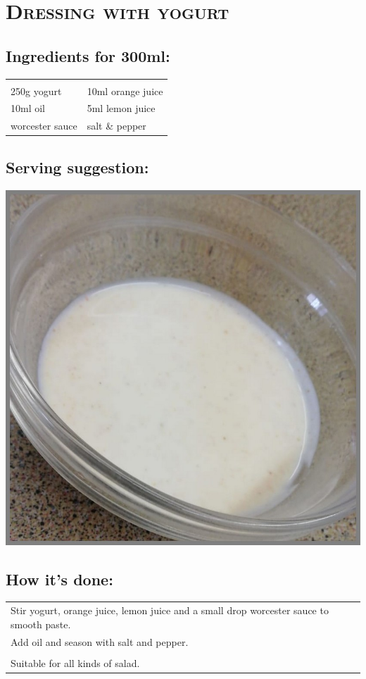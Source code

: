 \section{\textsc{Dressing with yogurt}}

\subsection*{Ingredients for 300ml:}

\begin{tabular}{p{7.5cm} p{7.5cm}}
	& \\
	250g yogurt & 10ml orange juice \\
	10ml oil & 5ml lemon juice \\
	worcester sauce & salt \& pepper
\end{tabular}

\subsection*{Serving suggestion:}

\includegraphics[width=\textwidth]{img/d_joghurt.jpeg} \cite{djoghurt}

\subsection*{How it's done:}

\begin{tabular}{p{15cm}}
	\\
	Stir yogurt, orange juice, lemon juice and a small drop worcester sauce to smooth paste.\\
	Add oil and season with salt and pepper.\\
	\\
	Suitable for all kinds of salad.
\end{tabular}

